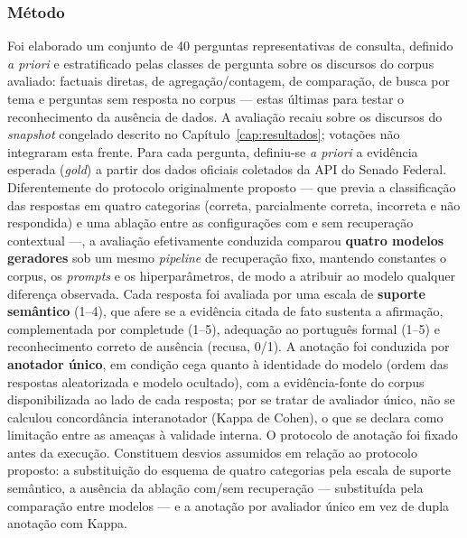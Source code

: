 \subsubsection{Método}
Foi elaborado um conjunto de 40 perguntas representativas de consulta, definido \textit{a priori} e estratificado pelas classes de pergunta sobre os discursos do corpus avaliado: factuais diretas, de agregação/contagem, de comparação, de busca por tema e perguntas sem resposta no corpus --- estas últimas para testar o reconhecimento da ausência de dados. A avaliação recaiu sobre os discursos do \textit{snapshot} congelado descrito no Capítulo~\ref{cap:resultados}; votações não integraram esta frente. Para cada pergunta, definiu-se \textit{a priori} a evidência esperada (\textit{gold}) a partir dos dados oficiais coletados da API do Senado Federal. Diferentemente do protocolo originalmente proposto --- que previa a classificação das respostas em quatro categorias (correta, parcialmente correta, incorreta e não respondida) e uma ablação entre as configurações com e sem recuperação contextual ---, a avaliação efetivamente conduzida comparou \textbf{quatro modelos geradores} sob um mesmo \textit{pipeline} de recuperação fixo, mantendo constantes o corpus, os \textit{prompts} e os hiperparâmetros, de modo a atribuir ao modelo qualquer diferença observada. Cada resposta foi avaliada por uma escala de \textbf{suporte semântico} (1--4), que afere se a evidência citada de fato sustenta a afirmação, complementada por completude (1--5), adequação ao português formal (1--5) e reconhecimento correto de ausência (recusa, 0/1). A anotação foi conduzida por \textbf{anotador único}, em condição cega quanto à identidade do modelo (ordem das respostas aleatorizada e modelo ocultado), com a evidência-fonte do corpus disponibilizada ao lado de cada resposta; por se tratar de avaliador único, não se calculou concordância interanotador (Kappa de Cohen), o que se declara como limitação entre as ameaças à validade interna. O protocolo de anotação foi fixado antes da execução. Constituem desvios assumidos em relação ao protocolo proposto: a substituição do esquema de quatro categorias pela escala de suporte semântico, a ausência da ablação com/sem recuperação --- substituída pela comparação entre modelos --- e a anotação por avaliador único em vez de dupla anotação com Kappa.

